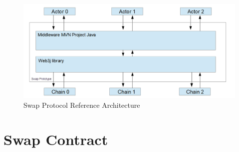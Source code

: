 
\begin{figure}[h]
	\includegraphics[width=0.7\paperwidth]{reference_architecture}
	\caption{Swap Protocol Reference Architecture}
	\label{fig:reference_architecture}
\end{figure}
\clearpage

%
%
\section{Swap Contract}
\label{sec:chapter04:smartcontracts}

